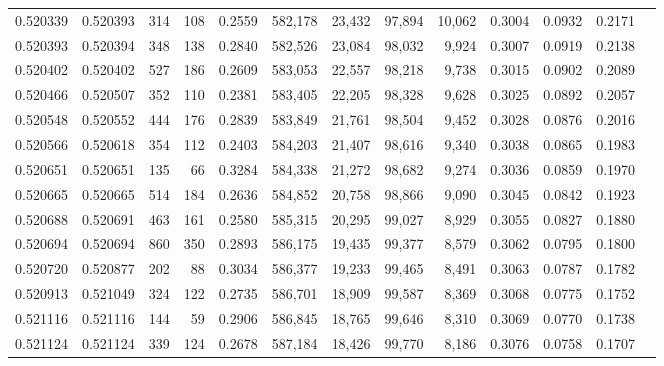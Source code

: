 \begin{tabular}{rrrrrrrrrrrrr}
0.520339 & 0.520393 &   314 &   108 &                                     0.2559 & 582,178 &  23,432 &  97,894 &  10,062 & 0.3004 & 0.0932 & 0.2171 \\
0.520393 & 0.520394 &   348 &   138 &                                     0.2840 & 582,526 &  23,084 &  98,032 &   9,924 & 0.3007 & 0.0919 & 0.2138 \\
0.520402 & 0.520402 &   527 &   186 &                                     0.2609 & 583,053 &  22,557 &  98,218 &   9,738 & 0.3015 & 0.0902 & 0.2089 \\
0.520466 & 0.520507 &   352 &   110 &                                     0.2381 & 583,405 &  22,205 &  98,328 &   9,628 & 0.3025 & 0.0892 & 0.2057 \\
0.520548 & 0.520552 &   444 &   176 &                                     0.2839 & 583,849 &  21,761 &  98,504 &   9,452 & 0.3028 & 0.0876 & 0.2016 \\
0.520566 & 0.520618 &   354 &   112 &                                     0.2403 & 584,203 &  21,407 &  98,616 &   9,340 & 0.3038 & 0.0865 & 0.1983 \\
0.520651 & 0.520651 &   135 &    66 &                                     0.3284 & 584,338 &  21,272 &  98,682 &   9,274 & 0.3036 & 0.0859 & 0.1970 \\
0.520665 & 0.520665 &   514 &   184 &                                     0.2636 & 584,852 &  20,758 &  98,866 &   9,090 & 0.3045 & 0.0842 & 0.1923 \\
0.520688 & 0.520691 &   463 &   161 &                                     0.2580 & 585,315 &  20,295 &  99,027 &   8,929 & 0.3055 & 0.0827 & 0.1880 \\
0.520694 & 0.520694 &   860 &   350 &                                     0.2893 & 586,175 &  19,435 &  99,377 &   8,579 & 0.3062 & 0.0795 & 0.1800 \\
0.520720 & 0.520877 &   202 &    88 &                                     0.3034 & 586,377 &  19,233 &  99,465 &   8,491 & 0.3063 & 0.0787 & 0.1782 \\
0.520913 & 0.521049 &   324 &   122 &                                     0.2735 & 586,701 &  18,909 &  99,587 &   8,369 & 0.3068 & 0.0775 & 0.1752 \\
0.521116 & 0.521116 &   144 &    59 &                                     0.2906 & 586,845 &  18,765 &  99,646 &   8,310 & 0.3069 & 0.0770 & 0.1738 \\
0.521124 & 0.521124 &   339 &   124 &                                     0.2678 & 587,184 &  18,426 &  99,770 &   8,186 & 0.3076 & 0.0758 & 0.1707 \\

\end{tabular}
